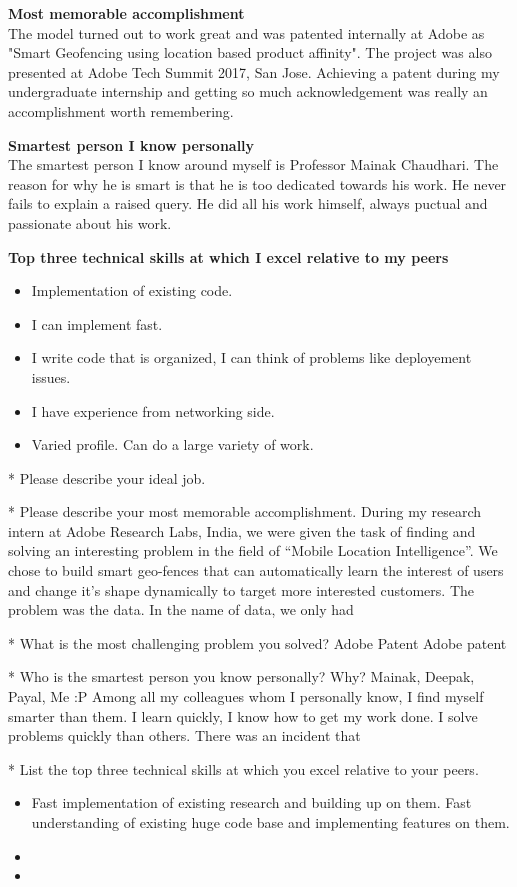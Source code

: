 \textbf{Most memorable accomplishment} \\
The model turned out to work great and was patented internally at Adobe as "Smart Geofencing using location based product affinity". The project was also presented at Adobe Tech Summit 2017, San Jose. Achieving a patent during my undergraduate internship and getting so much acknowledgement was really an accomplishment worth remembering.

\textbf{Smartest person I know personally}\\
The smartest person I know around myself is Professor Mainak Chaudhari. The reason for why he is smart is that he is too dedicated towards his work. He never fails to explain a raised query. He did all his work himself, always puctual and passionate about his work.

\textbf{Top three technical skills at which I excel relative to my peers}  
\begin{itemize}
	\item Implementation of existing code. 
	\item I can implement fast.
	\item I write code that is organized, I can think of problems like deployement issues. 
	\item I have experience from networking side.
	\item Varied profile. Can do a large variety of work.  
\end{itemize}
* Please describe your ideal job.



* Please describe your most memorable accomplishment.
During my research intern at Adobe Research Labs, India, we were given the task of finding and solving an interesting problem in the field of “Mobile Location Intelligence”. We chose to build smart geo-fences that can automatically learn the interest of users and change it’s shape dynamically to target more interested customers. The problem was the data. In the name of data, we only had 

* What is the most challenging problem you solved?
Adobe Patent
Adobe patent

* Who is the smartest person you know personally?  Why?
Mainak, Deepak, Payal, Me :P 
Among all my colleagues whom I personally know, I find myself smarter than them. I learn quickly, I know how to get my work done. I solve problems quickly than others. There was an incident that 


* List the top three technical skills at which you excel relative to your peers.
\begin{itemize}
	\item Fast implementation of existing research and building up on them. Fast understanding of existing huge code base and implementing features on them. 
	\item 
	\item 
\end{itemize}


